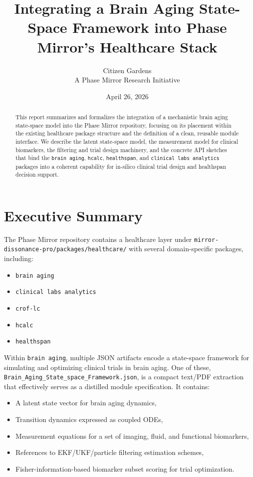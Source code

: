 \documentclass[11pt]{article}
\title{Integrating a Brain Aging State-Space Framework into Phase Mirror's Healthcare Stack}
\author{Citizen Gardens \\ A Phase Mirror Research Initiative}
\date{April 26, 2026}
\begin{document}
\maketitle

\begin{abstract}
This report summarizes and formalizes the integration of a mechanistic brain aging
state-space model into the Phase Mirror repository, focusing on its placement within
the existing healthcare package structure and the definition of a clean, reusable
module interface. We describe the latent state-space model, the measurement model for
clinical biomarkers, the filtering and trial design machinery, and the concrete API
sketches that bind the \texttt{brain aging}, \texttt{hcalc}, \texttt{healthspan}, and
\texttt{clinical labs analytics} packages into a coherent capability for in-silico
clinical trial design and healthspan decision support.
\end{abstract}
\newpage
\tableofcontents
\newpage
\section{Executive Summary}

The Phase Mirror repository contains a healthcare layer under
\texttt{mirror-dissonance-pro/packages/healthcare/} with several domain-specific
packages, including:
\begin{itemize}[noitemsep]
  \item \texttt{brain aging}
  \item \texttt{clinical labs analytics}
  \item \texttt{crof-lc}
  \item \texttt{hcalc}
  \item \texttt{healthspan}
\end{itemize}

Within \texttt{brain aging}, multiple JSON artifacts encode a state-space framework
for simulating and optimizing clinical trials in brain aging. One of these,
\texttt{Brain\_Aging\_State\_space\_Framework.json}, is a compact text/PDF extraction
that effectively serves as a distilled module specification. It contains:
\begin{itemize}[noitemsep]
  \item A latent state vector for brain aging dynamics,
  \item Transition dynamics expressed as coupled ODEs,
  \item Measurement equations for a set of imaging, fluid, and functional biomarkers,
  \item References to EKF/UKF/particle filtering estimation schemes,
  \item Fisher-information-based biomarker subset scoring for trial optimization.
\end{itemize}
\end{document}
